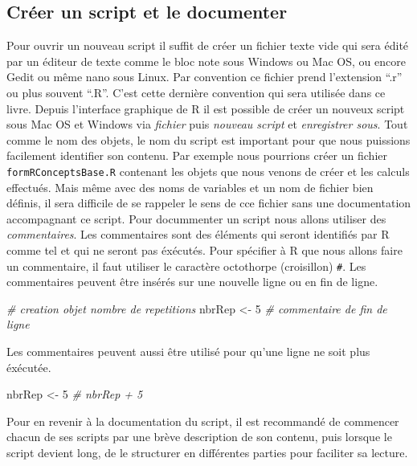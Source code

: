 \documentclass[]{book}
\newenvironment{Shaded}{\begin{snugshade}}{\end{snugshade}}
\newcommand{\DecValTok}[1]{\textcolor[rgb]{0.00,0.00,0.81}{#1}}
\newcommand{\StringTok}[1]{\textcolor[rgb]{0.31,0.60,0.02}{#1}}
\newcommand{\CommentTok}[1]{\textcolor[rgb]{0.56,0.35,0.01}{\textit{#1}}}
\newcommand{\NormalTok}[1]{#1}
\theoremstyle{definition}
\theoremstyle{definition}
\theoremstyle{definition}
\theoremstyle{remark}
\begin{document}
\subsection{Créer un script et le
documenter}\label{creer-un-script-et-le-documenter}

Pour ouvrir un nouveau script il suffit de créer un fichier texte vide
qui sera édité par un éditeur de texte comme le bloc note sous Windows
ou Mac OS, ou encore Gedit ou même nano sous Linux. Par convention ce
fichier prend l'extension ``.r'' ou plus souvent ``.R''. C'est cette
dernière convention qui sera utilisée dans ce livre. Depuis l'interface
graphique de R il est possible de créer un nouveux script sous Mac OS et
Windows via \emph{fichier} puis \emph{nouveau script} et
\emph{enregistrer sous}. Tout comme le nom des objets, le nom du script
est important pour que nous puissions facilement identifier son contenu.
Par exemple nous pourrions créer un fichier \texttt{formRConceptsBase.R}
contenant les objets que nous venons de créer et les calculs effectués.
Mais même avec des noms de variables et un nom de fichier bien définis,
il sera difficile de se rappeler le sens de cce fichier sans une
documentation accompagnant ce script. Pour docummenter un script nous
allons utiliser des \emph{commentaires}. Les commentaires sont des
éléments qui seront identifiés par R comme tel et qui ne seront pas
éxécutés. Pour spécifier à R que nous allons faire un commentaire, il
faut utiliser le caractère octothorpe (croisillon) \texttt{\#}. Les
commentaires peuvent être insérés sur une nouvelle ligne ou en fin de
ligne.

\begin{Shaded}
\begin{Highlighting}[]
\CommentTok{# creation objet nombre de repetitions}
\NormalTok{nbrRep <-}\StringTok{ }\DecValTok{5} \CommentTok{# commentaire de fin de ligne}
\end{Highlighting}
\end{Shaded}

Les commentaires peuvent aussi être utilisé pour qu'une ligne ne soit
plus éxécutée.

\begin{Shaded}
\begin{Highlighting}[]
\NormalTok{nbrRep <-}\StringTok{ }\DecValTok{5}
\CommentTok{# nbrRep + 5}
\end{Highlighting}
\end{Shaded}

Pour en revenir à la documentation du script, il est recommandé de
commencer chacun de ses scripts par une brève description de son
contenu, puis lorsque le script devient long, de le structurer en
différentes parties pour faciliter sa lecture.
\end{document}
